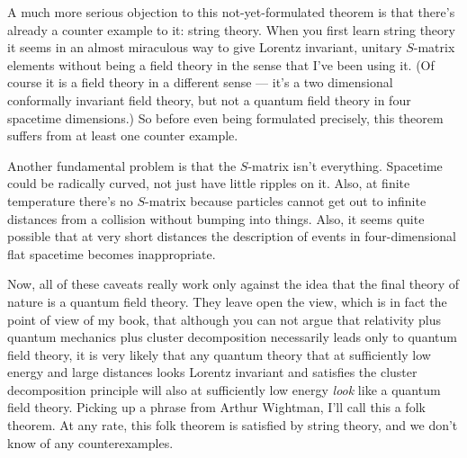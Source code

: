 \documentclass[12pt]{article}
\begin{document}
A much more serious objection to this
not-yet-formulated theorem is that there's already a counter
example to it: string theory.  When you first learn string
theory it seems in an almost miraculous way to give Lorentz
invariant, unitary $S$-matrix elements without being a field
theory in the sense that I've been using it.  (Of course it
is a field theory in a different sense --- it's a two
dimensional conformally invariant field theory, but not a
quantum field theory in four spacetime dimensions.)  So
before even being formulated precisely, this theorem suffers
from at least one counter example.

Another fundamental problem is that the $S$-matrix isn't
everything.  Spacetime could be radically curved, not just
have little ripples on it.  Also, at finite temperature
there's no $S$-matrix because particles cannot get out to
infinite distances from a collision without bumping into
things.  Also, it seems quite possible that at very short
distances the description of events in four-dimensional flat
spacetime becomes inappropriate.

Now, all of these caveats really work only against the idea
that the final theory of nature is a quantum field theory.
They leave open the view, which is in fact the point of view
of my book,  that although you can not argue that relativity
plus quantum mechanics plus cluster decomposition
necessarily leads only to quantum field theory,   it is very
likely that any quantum theory that at sufficiently low
energy and large distances looks Lorentz invariant and
satisfies the cluster decomposition principle  will also at
sufficiently low energy {\em look} like a quantum field
theory.      Picking up a phrase from Arthur Wightman, I'll
call this a folk theorem.  At any rate, this folk theorem is
satisfied by string theory, and we don't know of any
counterexamples.
\end{document}
